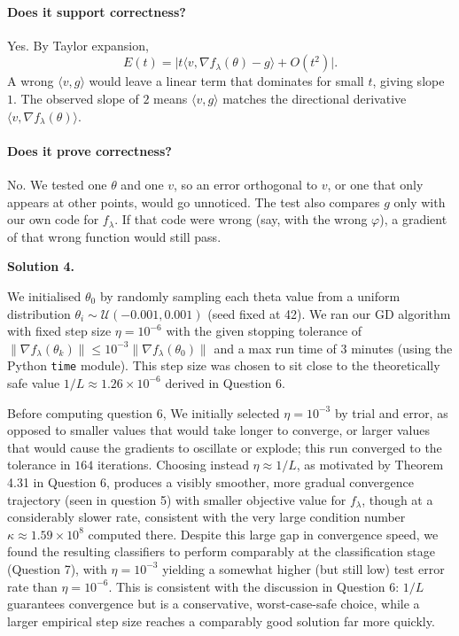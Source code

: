 \documentclass[12pt]{article}
\newcommand{\solution}[1]{\vspace{1em}\noindent \textbf{Solution #1.}\par}
\begin{document}
\paragraph{Does it support correctness?} Yes. By Taylor expansion,
\[
  E(t) = \bigl\lvert t \langle v, \nabla f_\lambda(\theta) - g \rangle + O(t^2) \bigr\rvert .
\]
A wrong $\langle v, g \rangle$ would leave a linear term that dominates for
small $t$, giving slope $1$. The observed slope of $2$ means $\langle v, g \rangle$
matches the directional derivative $\langle v, \nabla f_\lambda(\theta) \rangle$.

\paragraph{Does it prove correctness?} No. We tested one $\theta$ and one $v$,
so an error orthogonal to $v$, or one that only appears at other points, would
go unnoticed. The test also compares $g$ only with our own code for $f_\lambda$. If that code were wrong (say, with the wrong $\varphi$), a gradient of that wrong function would still pass.

\solution{4}

We initialised $\theta_0$ by randomly sampling each theta value from a uniform distribution $\theta_i \sim \mathcal{U}(-0.001, 0.001)$ (seed fixed at 42). We ran our GD algorithm with fixed step size $\eta = 10^{-6}$ with the given stopping tolerance of $\|\nabla f_\lambda(\theta_k)\| \leq 10^{-3}\|\nabla f_\lambda(\theta_0)\|$ and a max run time of 3 minutes (using the Python \texttt{time} module). This step size was chosen to sit close to the theoretically safe value $1/L \approx 1.26 \times 10^{-6}$ derived in Question 6.

Before computing question 6, We initially selected $\eta = 10^{-3}$ by trial and error, as opposed to smaller values that would take longer to converge, or larger values that would cause the gradients to oscillate or explode; this run converged to the tolerance in $164$ iterations. Choosing instead $\eta \approx 1/L$, as motivated by Theorem 4.31 in Question 6, produces a visibly smoother, more gradual convergence trajectory (seen in question 5) with smaller objective value for $f_\lambda$, though at a considerably slower rate, consistent with the very large condition number $\kappa \approx 1.59 \times 10^8$ computed there. Despite this large gap in convergence speed, we found the resulting classifiers to perform comparably at the classification stage (Question 7), with $\eta = 10^{-3}$ yielding a somewhat higher (but still low) test error rate than $\eta = 10^{-6}$. This is consistent with the discussion in Question 6: $1/L$ guarantees convergence but is a conservative, worst-case-safe choice, while a larger empirical step size reaches a comparably good solution far more quickly.
\end{document}
